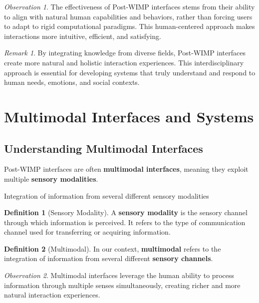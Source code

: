\documentclass[11pt,a4paper]{article}
\theoremstyle{definition}
\newtheorem{definition}{Definition}[section]
\theoremstyle{plain}
\theoremstyle{remark}
\newtheorem*{remark}{Remark}
\newtheorem*{observation}{Observation}
\begin{document}
\begin{observation}
The effectiveness of Post-WIMP interfaces stems from their ability to align with natural human capabilities and behaviors, rather than forcing users to adapt to rigid computational paradigms. This human-centered approach makes interactions more intuitive, efficient, and satisfying.
\end{observation}

\begin{remark}
By integrating knowledge from diverse fields, Post-WIMP interfaces create more natural and holistic interaction experiences. This interdisciplinary approach is essential for developing systems that truly understand and respond to human needs, emotions, and social contexts.
\end{remark}

\section{Multimodal Interfaces and Systems}

\subsection{Understanding Multimodal Interfaces}

Post-WIMP interfaces are often \textbf{multimodal interfaces}, meaning they exploit multiple \textbf{sensory modalities}.

\begin{tcolorbox}[colback=purple!5!white,colframe=purple!75!black,title=\textbf{Multimodal = Multiple Sensory Channels}]
Integration of information from several different sensory modalities
\end{tcolorbox}

\begin{definition}[Sensory Modality]
A \textbf{sensory modality} is the sensory channel through which information is perceived. It refers to the type of communication channel used for transferring or acquiring information.
\end{definition}

\begin{definition}[Multimodal]
In our context, \textbf{multimodal} refers to the integration of information from several different \textbf{sensory channels}.
\end{definition}

\begin{observation}
Multimodal interfaces leverage the human ability to process information through multiple senses simultaneously, creating richer and more natural interaction experiences.
\end{observation}
\end{document}
